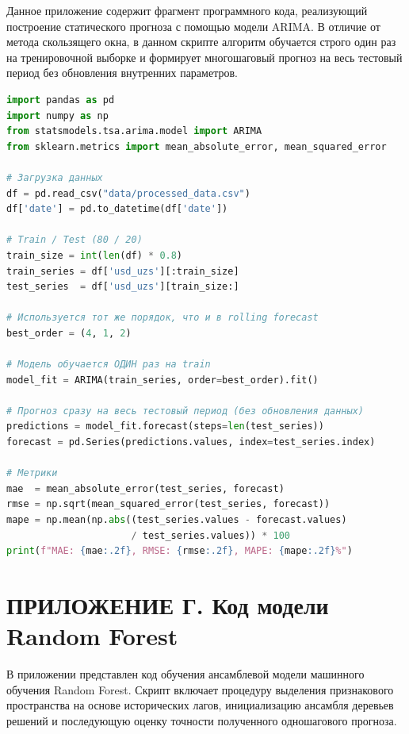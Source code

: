Данное приложение содержит фрагмент программного кода, реализующий построение статического прогноза с помощью модели ARIMA. В отличие от метода скользящего окна, в данном скрипте алгоритм обучается строго один раз на тренировочной выборке и формирует многошаговый прогноз на весь тестовый период без обновления внутренних параметров.
 
\begin{lstlisting}[language=Python, basicstyle=\small\ttfamily, breaklines=true]
import pandas as pd
import numpy as np
from statsmodels.tsa.arima.model import ARIMA
from sklearn.metrics import mean_absolute_error, mean_squared_error
 
# Загрузка данных
df = pd.read_csv("data/processed_data.csv")
df['date'] = pd.to_datetime(df['date'])
 
# Train / Test (80 / 20)
train_size = int(len(df) * 0.8)
train_series = df['usd_uzs'][:train_size]
test_series  = df['usd_uzs'][train_size:]
 
# Используется тот же порядок, что и в rolling forecast
best_order = (4, 1, 2)
 
# Модель обучается ОДИН раз на train
model_fit = ARIMA(train_series, order=best_order).fit()
 
# Прогноз сразу на весь тестовый период (без обновления данных)
predictions = model_fit.forecast(steps=len(test_series))
forecast = pd.Series(predictions.values, index=test_series.index)
 
# Метрики
mae  = mean_absolute_error(test_series, forecast)
rmse = np.sqrt(mean_squared_error(test_series, forecast))
mape = np.mean(np.abs((test_series.values - forecast.values)
                      / test_series.values)) * 100
print(f"MAE: {mae:.2f}, RMSE: {rmse:.2f}, MAPE: {mape:.2f}%")
\end{lstlisting}
 
\section*{ПРИЛОЖЕНИЕ Г. Код модели Random Forest}
\label{app:rf}

В приложении представлен код обучения ансамблевой модели машинного обучения Random Forest. Скрипт включает процедуру выделения признакового пространства на основе исторических лагов, инициализацию ансамбля деревьев решений и последующую оценку точности полученного одношагового прогноза.
 
